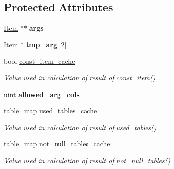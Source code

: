 \subsection*{Protected Attributes}
\begin{DoxyCompactItemize}
\item 
\mbox{\label{classItem__func_a1da80018171c5e30b090cf8ae204ec27}} 
\mbox{\hyperlink{classItem}{Item}} $\ast$$\ast$ {\bfseries args}
\item 
\mbox{\label{classItem__func_a3e345858a0268bdfcb7f38bec6649ce8}} 
\mbox{\hyperlink{classItem}{Item}} $\ast$ {\bfseries tmp\+\_\+arg} \mbox{[}2\mbox{]}
\item 
\mbox{\label{classItem__func_a5c3ce683f091c957f4d164fe4d6403f8}} 
bool \mbox{\hyperlink{classItem__func_a5c3ce683f091c957f4d164fe4d6403f8}{const\+\_\+item\+\_\+cache}}
\begin{DoxyCompactList}\small\item\em Value used in calculation of result of const\+\_\+item() \end{DoxyCompactList}\item 
\mbox{\label{classItem__func_affd494e11d2e93c80d61b70bf14c499f}} 
uint {\bfseries allowed\+\_\+arg\+\_\+cols}
\item 
\mbox{\label{classItem__func_a663d83299b42a9afbc090dc9286d2603}} 
table\+\_\+map \mbox{\hyperlink{classItem__func_a663d83299b42a9afbc090dc9286d2603}{used\+\_\+tables\+\_\+cache}}
\begin{DoxyCompactList}\small\item\em Value used in calculation of result of used\+\_\+tables() \end{DoxyCompactList}\item 
\mbox{\label{classItem__func_ae62695d67fc6167d3b142bc5b1065d87}} 
table\+\_\+map \mbox{\hyperlink{classItem__func_ae62695d67fc6167d3b142bc5b1065d87}{not\+\_\+null\+\_\+tables\+\_\+cache}}
\begin{DoxyCompactList}\small\item\em Value used in calculation of result of not\+\_\+null\+\_\+tables() \end{DoxyCompactList}\end{DoxyCompactItemize}
